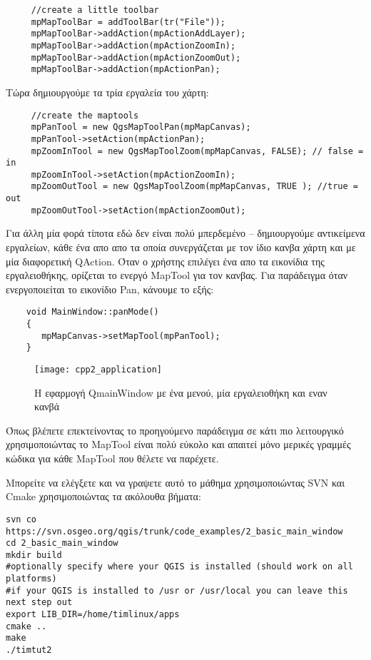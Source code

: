 \begin{verbatim}
     //create a little toolbar
     mpMapToolBar = addToolBar(tr("File"));
     mpMapToolBar->addAction(mpActionAddLayer);
     mpMapToolBar->addAction(mpActionZoomIn);
     mpMapToolBar->addAction(mpActionZoomOut);
     mpMapToolBar->addAction(mpActionPan);
\end{verbatim}

Τώρα δημιουργούμε τα τρία εργαλεία του χάρτη: 

\begin{verbatim}
     //create the maptools
     mpPanTool = new QgsMapToolPan(mpMapCanvas);
     mpPanTool->setAction(mpActionPan);
     mpZoomInTool = new QgsMapToolZoom(mpMapCanvas, FALSE); // false = in
     mpZoomInTool->setAction(mpActionZoomIn);
     mpZoomOutTool = new QgsMapToolZoom(mpMapCanvas, TRUE ); //true = out
     mpZoomOutTool->setAction(mpActionZoomOut);
\end{verbatim}

Για άλλη μία φορά τίποτα εδώ δεν είναι πολύ μπερδεμένο – δημιουργούμε αντικείμενα εργαλείων, κάθε ένα απο απο τα οποία συνεργάζεται με τον ίδιο κανβα χάρτη και με μία διαφορετική QAction. Όταν ο χρήστης επιλέγει ένα απο τα εικονίδια της εργαλειοθήκης, ορίζεται το ενεργό MapTool για τον κανβας.  Για παράδειγμα όταν ενεργοποιείται το εικονίδιο Pan, κάνουμε το εξής: 

\begin{verbatim}
    void MainWindow::panMode()
    {
       mpMapCanvas->setMapTool(mpPanTool); 
    }
\end{verbatim}

\begin{figure}[ht]
   \begin{center}
   \caption{Η εφαρμογή QmainWindow με ένα μενού, μία εργαλειοθήκη και εναν κανβά
\osxcaption}\label{fig:cpp2_application}\smallskip
   \texttt{[image: cpp2\_application]}
\end{center}
\end{figure}


Όπως βλέπετε επεκτείνοντας το προηγούμενο παράδειγμα σε κάτι πιο λειτουργικό χρησιμοποιώντας το MapTool είναι πολύ εύκολο και απαιτεί μόνο μερικές γραμμές κώδικα για κάθε MapTool που θέλετε να παρέχετε.

Μπορείτε να ελέγξετε και να γραψετε αυτό το μάθημα χρησιμοποιώντας SVN και Cmake χρησιμοποιώντας τα ακόλουθα βήματα:

\begin{verbatim}
svn co https://svn.osgeo.org/qgis/trunk/code_examples/2_basic_main_window
cd 2_basic_main_window
mkdir build
#optionally specify where your QGIS is installed (should work on all platforms)
#if your QGIS is installed to /usr or /usr/local you can leave this next step out
export LIB_DIR=/home/timlinux/apps
cmake ..
make
./timtut2
\end{verbatim}



